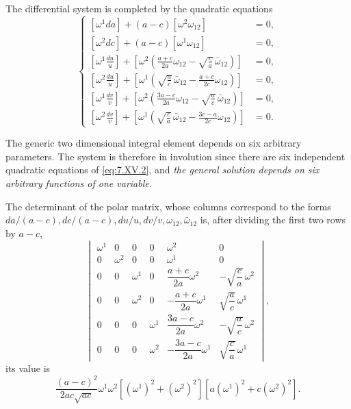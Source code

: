 \documentclass[leqno,11pt]{book}
\numberwithin{equation}{chapter}
\theoremstyle{shape1}
\theoremstyle{shape0}
\theoremstyle{shape2}
\theoremstyle{definition}
\begin{document}
The differential system is completed by the quadratic equations
\begin{equation}
  \label{eq:7.XV.2}\tag{XV, 2}
  \left\{
    \begin{aligned}{}
      [\omega^{1}da]+(a-c)[\omega^{2}\omega_{12}]&=0,\\
      [\omega^{2}dc]+(a-c)[\omega^{1}\omega_{12}]&=0,\\
      \left[\omega^{1}\frac{du}{u}\right]+\left[\omega^{2}\left(\frac{a+c}{2a}\omega_{12}-\sqrt{\frac{c}{a}}\,\bar\omega_{12}\right)\right]&=0,\\
      \left[\omega^{2}\frac{du}{u}\right]+\left[\omega^{1}\left(\sqrt{\frac{a}{c}}\,\bar\omega_{12}-{\frac{a+c}{2c}}\omega_{12}\right)\right]&=0,\\
      \left[\omega^{1}\frac{dv}{v}\right]+\left[\omega^{2}\left(\frac{3a-c}{2a}\omega_{12}-\sqrt{\frac{a}{c}}\,\bar\omega_{12}\right)\right]&=0,\\
      \left[\omega^{2}\frac{dv}{v}\right]+\left[\omega^{1}\left(\sqrt{\frac{c}{a}}\,\bar\omega_{12}-{\frac{3c-a}{2c}}\omega_{12}\right)\right]&=0.
    \end{aligned}
  \right.
\end{equation}

The generic two dimensional integral element depends on six arbitrary parameters. The system is therefore in involution since there are six independent quadratic equations of \eqref{eq:7.XV.2}, and \emph{the general solution depends on six arbitrary functions of one variable.}

The determinant of the polar matrix, whose columns correspond to the forms $da/(a-c),dc/(a-c),du/u,dv/v,\omega_{12},\bar\omega_{12}$ is, after dividing the first two rows by $a-c$,
\[
\begin{vmatrix}
  \omega^{1}&0&0&0&\omega^{2}&0\\
  0&\omega^{2}&0&0&\omega^{1}&0\\
  0&0&\omega^{1}&0&\dfrac{a+c}{2a}\omega^{2}&-\sqrt{\dfrac{c}{a}}\,\omega^{2}\\
  0&0&\omega^{2}&0&-\dfrac{a+c}{2a}\omega^{1}&\sqrt{\dfrac{a}{c}}\,\omega^{1}\\
  0&0&0&\omega^{1}&\dfrac{3a-c}{2a}\omega^{2}&-\sqrt{\dfrac{a}{c}}\,\omega^{2}\\
  0&0&0&\omega^{2}&-\dfrac{3a-c}{2a}\omega^{1}&\sqrt{\dfrac{c}{a}}\,\omega^{1}
\end{vmatrix},
\]
its value is
\[
\frac{(a-c)^{2}}{2ac\sqrt{ac}}\omega^{1}\omega^{2}[(\omega^{1})^{2}+(\omega^{2})^{2}][a(\omega^{1})^{2}+c(\omega^{2})^{2}].
\]
\end{document}
